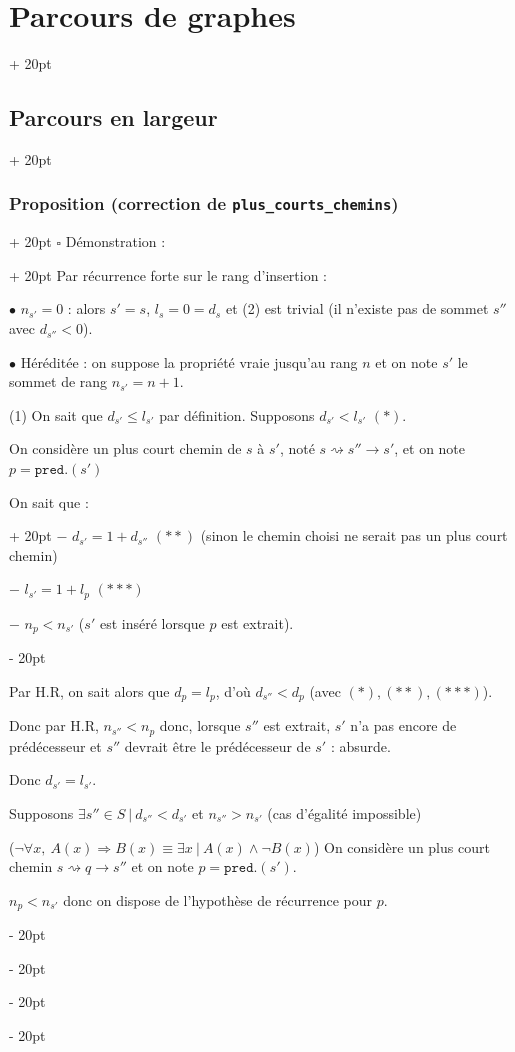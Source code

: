 \documentclass[a4paper, 12pt, twoside]{article}
\renewcommand{\le}{\leqslant}
\newcommand{\ind}[1][20pt]{\advance\leftskip + #1}
\newcommand{\deind}[1][20pt]{\advance\leftskip - #1}
\newenvironment{indt}[2][20pt]{#2 \par \ind[#1]}{\par \deind} %
\begin{document}
\begin{indt}{\section{Parcours de graphes}}
\begin{indt}{\subsection{Parcours en largeur}}
\begin{indt}{\subsubsection{Proposition (correction de \texttt{plus\_courts\_chemins})}}
                \begin{indt}{$\square$ Démonstration :}
                    Par récurrence forte sur le rang d'insertion :

                    $\bullet$ $n_{s'} = 0$ : alors $s' = s$, $l_s = 0 = d_s$ et (2) est trivial (il n'existe pas de sommet $s''$ avec $d_{s''} <0$).

                    $\bullet$ Héréditée : on suppose la propriété vraie jusqu'au rang $n$ et on note $s'$ le sommet de rang $n_{s'} = n + 1$.

                    (1) On sait que $d_{s'} \le l_{s'}$ par définition. Supposons $d_{s'} < l_{s'}$ $(*)$.

                    On considère un plus court chemin de $s$ à $s'$, noté $s \rightsquigarrow s'' \rightarrow s'$, et on note $p = \mathtt{pred}.(s')$

                    \begin{indt}{On sait que :}
                        $-$ $d_{s'} = 1 + d_{s''}$ $(**)$ (sinon le chemin choisi ne serait pas un plus court chemin)

                        $-$ $l_{s'} = 1 + l_p$ $(***)$

                        $-$ $n_p < n_{s'}$ ($s'$ est inséré lorsque $p$ est extrait).
                    \end{indt}

                    Par H.R, on sait alors que $d_p = l_p$, d'où $d_{s''} < d_p$ (avec $(*), (**), (***)$).

                    Donc par H.R, $n_{s''} < n_p$ donc, lorsque $s''$ est extrait, $s'$ n'a pas encore de prédécesseur et $s''$ devrait être le prédécesseur de $s'$ : absurde.

                    Donc $d_{s'} = l_{s'}$.

                    \vspace{12pt}
                    
                    Supposons $\exists s'' \in S\ |\ d_{s''} < d_{s'}$ et $n_{s''} > n_{s'}$ (cas d'égalité impossible)

                    ($\neg \forall x,\ A(x) \Rightarrow B(x) \equiv \exists x\ |\ A(x) \wedge \neg B(x)$)
                    On considère un plus court chemin $s \rightsquigarrow q \rightarrow s''$ et on note $p = \mathtt{pred}.(s')$.

                    $n_p < n_{s'}$ donc on dispose de l'hypothèse de récurrence pour $p$.


\end{indt}
\end{indt}
\end{indt}
\end{indt}
\end{document}
